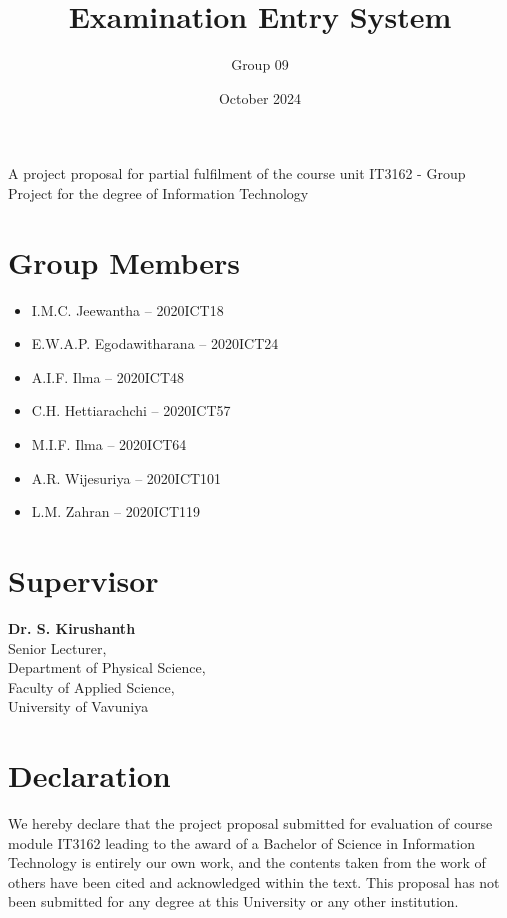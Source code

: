 \documentclass[12pt]{article}
\title{Examination Entry System}
\author{Group 09}
\date{October 2024}
\begin{document}
\maketitle

\begin{center}
    \justifying
    A project proposal for partial fulfilment of the course unit IT3162 - Group Project for the degree of Information Technology
\end{center}

\section*{Group Members}
\begin{itemize}
    \item I.M.C. Jeewantha – 2020ICT18
    \item E.W.A.P. Egodawitharana – 2020ICT24
    \item A.I.F. Ilma – 2020ICT48
    \item C.H. Hettiarachchi – 2020ICT57
    \item M.I.F. Ilma – 2020ICT64
    \item A.R. Wijesuriya – 2020ICT101
    \item L.M. Zahran – 2020ICT119
\end{itemize}

\section*{Supervisor}
\textbf{Dr. S. Kirushanth}\\
Senior Lecturer,\\
Department of Physical Science,\\
Faculty of Applied Science,\\
University of Vavuniya

\newpage

\section*{Declaration}
\justifying
We hereby declare that the project proposal submitted for evaluation of course module IT3162 leading to the award of a Bachelor of Science in Information Technology is entirely our own work, and the contents taken from the work of others have been cited and acknowledged within the text. This proposal has not been submitted for any degree at this University or any other institution.\\
\end{document}
